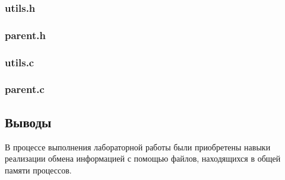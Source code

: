 \documentclass[12pt]{article}
\begin{document}
	\subsubsection*{utils.h}
	
	
	
	\subsubsection*{parent.h}
	
	
	
	\subsubsection{utils.c}
	
	
	
	\subsubsection{parent.c}
	
	
	
	\subsection*{Выводы}
	
	В процессе выполнения лабораторной работы были приобретены навыки реализации обмена информацией с помощью файлов, находящихся в общей памяти процессов.
	
\end{document}
